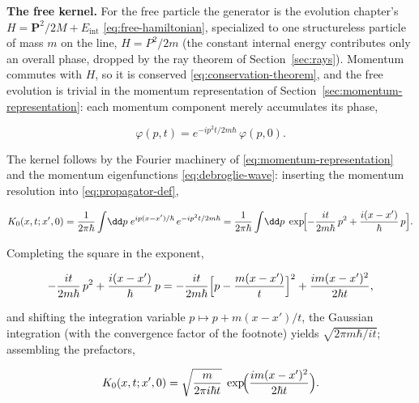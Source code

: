 \medskip\noindent\textbf{The free kernel.} For the free particle the generator is the evolution chapter's $H = \bm P^2/2M + E_{\mathrm{int}}$ \eqref{eq:free-hamiltonian}, specialized to one structureless particle of mass $m$ on the line, $H = P^2/2m$ (the constant internal energy contributes only an overall phase, dropped by the ray theorem of Section~\ref{sec:rays}). Momentum commutes with $H$, so it is conserved \eqref{eq:conservation-theorem}, and the free evolution is trivial in the momentum representation of Section~\ref{sec:momentum-representation}: each momentum component merely accumulates its phase,
\begin{linenomath}
    \begin{equation*}
        \varphi(p, t) = e^{-ip^2 t/2m\hbar}\,\varphi(p, 0) .
    \end{equation*}
\end{linenomath}
The kernel follows by the Fourier machinery of \eqref{eq:momentum-representation} and the momentum eigenfunctions \eqref{eq:debroglie-wave}: inserting the momentum resolution into \eqref{eq:propagator-def},
\begin{linenomath}
    \begin{equation}
        K_0(x, t; x', 0)
        = \frac{1}{2\pi\hbar}\int\!\dd p\; e^{ip(x-x')/\hbar}\,e^{-ip^2 t/2m\hbar}
        = \frac{1}{2\pi\hbar}\int\!\dd p\; \exp\!\Bigl[-\frac{it}{2m\hbar}\,p^2 + \frac{i(x-x')}{\hbar}\,p\Bigr] .
    \end{equation}
\end{linenomath}
Completing the square in the exponent,
\begin{linenomath}
    \begin{equation*}
        -\frac{it}{2m\hbar}\,p^2 + \frac{i(x-x')}{\hbar}\,p
        = -\frac{it}{2m\hbar}\Bigl[p - \frac{m(x-x')}{t}\Bigr]^2
        + \frac{im(x-x')^2}{2\hbar t} ,
    \end{equation*}
\end{linenomath}
and shifting the integration variable $p \mapsto p + m(x-x')/t$, the Gaussian integration (with the convergence factor of the footnote) yields $\sqrt{2\pi m\hbar/it}$; assembling the prefactors,
\begin{linenomath}
    \begin{equation}
        K_0(x, t; x', 0)
        = \sqrt{\frac{m}{2\pi i\hbar t}}\;\exp\!\Bigl(\frac{im(x-x')^2}{2\hbar t}\Bigr) .
        \label{eq:free-propagator}
    \end{equation}
\end{linenomath}
